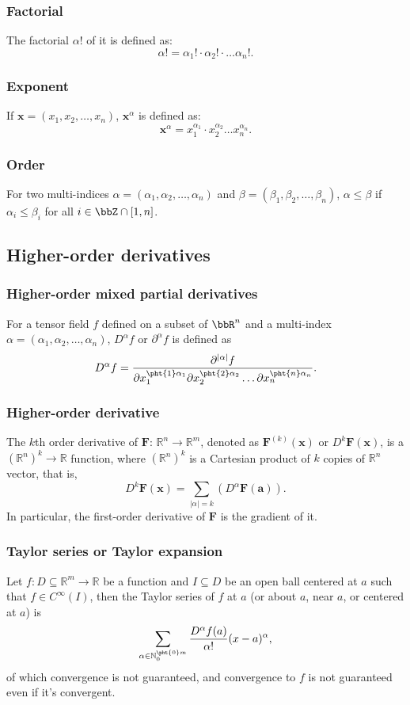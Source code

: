 \documentclass[a4paper,12pt]{report}
\begin{document}
\begin{itemize}
\begin{itemize}
\subsubsection{Factorial}
The factorial \( \alpha! \) of it is defined as:
\[\alpha! = \alpha_1! \cdot \alpha_2! \cdot \ldots \alpha_n!.\]
\subsubsection{Exponent}
If \( \mathbf{x} = (x_1, x_2,\ldots, x_n) \), $\mathbf{x}^\alpha$ is defined as:
\[\mathbf{x}^\alpha = x_1^{\alpha_1} \cdot x_2^{\alpha_2} \ldots  x_n^{\alpha_n}.\]
\subsubsection{Order}
For two multi-indices $\alpha=(\alpha_1, \alpha_2,\ldots, \alpha_n)$ and $\beta=(\beta_1, \beta_2,\ldots,\beta_n)$, $\alpha\le\beta$ if $\alpha_i\le\beta_i$ for all $i\in\bbZ\cap[1,n]$.
\subsection{Higher-order derivatives}
\subsubsection{Higher-order mixed partial derivatives}
For a tensor field $f$ defined on a subset of $\bbR^n$ and a multi-index $\alpha=(\alpha_1, \alpha_2,\ldots, \alpha_n)$, $D^\alpha f$ or $\partial^\alpha f$ is defined as
\[D^\alpha f = \frac{\partial^{|\alpha|} f}{\partial x_1^{\pht{1}\alpha_1} \partial x_2^{\pht{2}\alpha_2} \ldots  \partial x_n^{\pht{n}\alpha_n}}.\]
\subsubsection{Higher-order derivative}
The $k$th order derivative of $\mathbf{F}:\,\mathbb{R}^n\to\mathbb{R}^m$, denoted as $\mathbf{F}^{(k)}(\mathbf{x})$ or $D^{k}\mathbf{F}(\mathbf{x})$, is a $(\mathbb{R}^n)^k\to\mathbb{R}$ function, where $(\mathbb{R}^n)^k$ is a Cartesian product of $k$ copies of $\mathbb{R}^n$ vector, that is,
\[D^{k}\mathbf{F}(\mathbf{x})=\sum_{|\alpha|=k} \left(D^\alpha \mathbf{F}(\mathbf{a})\right).\]
In particular, the first-order derivative of $\mathbf{F}$ is the gradient of it.
\subsubsection{Taylor series or Taylor expansion}
Let $f\colon D\subseteq\mathbb{R}^m\to\mathbb{R}$ be a function and $I\subseteq D$ be an open ball centered at $a$ such that $f\in C^{\infty}(I)$, then the Taylor series of $f$ at $a$ (or about $a$, near $a$, or centered at $a$) is
\[\sum_{\alpha\in\mathbb{N}_0^{\pht{0}m}}\frac{D^{\alpha}f(a)}{\alpha !}(x-a)^{\alpha},\]
of which convergence is not guaranteed, and convergence to $f$ is not guaranteed even if it's convergent.


\end{itemize}
\end{itemize}
\end{document}
